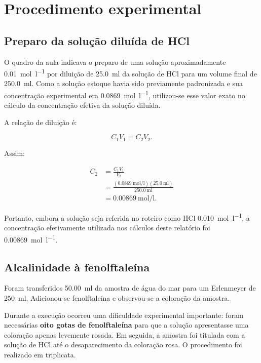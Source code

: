 \documentclass[a4paper,12pt]{article}
\newcommand{\ConcHClEstoque}{0.0869}
\newcommand{\VolHClEstoque}{25.0}
\newcommand{\VolHClFinal}{250.0}
\newcommand{\ConcHClTrabalho}{0.00869}
\newcommand{\VolAmostra}{50.00}
\begin{document}
\section{Procedimento experimental}

\subsection{Preparo da solução diluída de HCl}

O quadro da aula indicava o preparo de uma solução aproximadamente
\qty{0.01}{\mole\per\litre} por diluição de \qty{25.0}{\milli\litre} da
solução de HCl para um volume final de \qty{250.0}{\milli\litre}.
Como a solução estoque havia sido previamente padronizada e sua concentração
experimental era \qty{\ConcHClEstoque}{\mole\per\litre}, utilizou-se esse
valor exato no cálculo da concentração efetiva da solução diluída.

A relação de diluição é:

\begin{equation}
C_1V_1=C_2V_2.
\end{equation}

Assim:

\begin{align}
C_2
&=
\frac{C_1V_1}{V_2}\\
&=
\frac{
\left(\qty{\ConcHClEstoque}{\mole\per\litre}\right)
\left(\qty{\VolHClEstoque}{\milli\litre}\right)}
{\qty{\VolHClFinal}{\milli\litre}}\\
&=
\boxed{\qty{\ConcHClTrabalho}{\mole\per\litre}}.
\end{align}

Portanto, embora a solução seja referida no roteiro como HCl
\qty{0.010}{\mole\per\litre}, a concentração efetivamente utilizada nos
cálculos deste relatório foi \qty{\ConcHClTrabalho}{\mole\per\litre}.

\subsection{Alcalinidade à fenolftaleína}

Foram transferidos \qty{\VolAmostra}{\milli\litre} da amostra de água do
mar para um Erlenmeyer de \qty{250}{\milli\litre}. Adicionou-se
fenolftaleína e observou-se a coloração da amostra.

Durante a execução ocorreu uma dificuldade experimental importante: foram
necessárias \textbf{oito gotas de fenolftaleína} para que a solução
apresentasse uma coloração apenas levemente rosada. Em seguida, a amostra
foi titulada com a solução de HCl até o desaparecimento da coloração rosa.
O procedimento foi realizado em triplicata.
\end{document}
